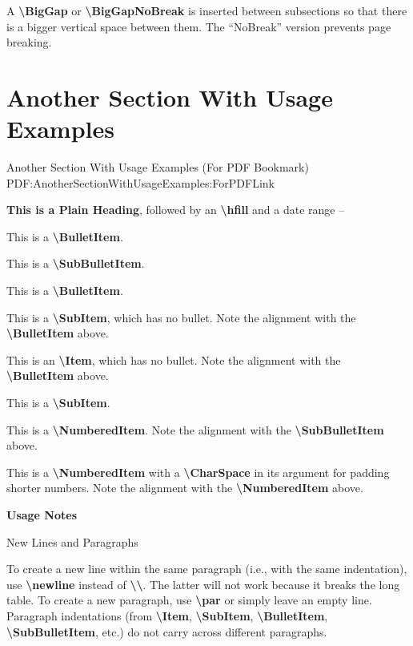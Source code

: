 \documentclass[letterpaper,MMMyyyy,nonstop]{simpleresumecv}
\newcommand{\CodeCommand}[1]{\mbox{\textbf{\textbackslash{#1}}}}
\begin{document}
\begin{body}
\GapNoBreak
\BulletItem
A \CodeCommand{BigGap} or \CodeCommand{BigGapNoBreak} is inserted between subsections so that there is a bigger vertical space between them.
The ``NoBreak'' version prevents page breaking.


\section
{Another\newline
Section\newline
With\newline
Usage\newline
Examples}
{Another Section With Usage Examples (For PDF Bookmark)}
{PDF:AnotherSectionWithUsageExamples:ForPDFLink}

\textbf{This is a Plain Heading},
followed by an \CodeCommand{hfill} and a date range
\hfill
{} --

\GapNoBreak
\BulletItem
This is a \CodeCommand{BulletItem}.
\begin{detail}
\SubBulletItem
This is a \CodeCommand{SubBulletItem}.
\end{detail}

\GapNoBreak
\BulletItem
This is a \CodeCommand{BulletItem}.
\begin{detail}
\SubItem
This is a \CodeCommand{SubItem}, which has no bullet.
Note the alignment with the \CodeCommand{BulletItem} above.
\end{detail}

\GapNoBreak
\Item
This is an \CodeCommand{Item}, which has no bullet.
Note the alignment with the \CodeCommand{BulletItem} above.
\begin{detail}
\SubItem
This is a \CodeCommand{SubItem}.
\end{detail}

\GapNoBreak
\NumberedItem{[16]}
This is a \CodeCommand{NumberedItem}.
Note the alignment with the \CodeCommand{SubBulletItem} above.

\GapNoBreak
\NumberedItem{{\CharSpace}[6]}
This is a \CodeCommand{NumberedItem} with a \CodeCommand{CharSpace} in its argument for padding shorter numbers.
Note the alignment with the \CodeCommand{NumberedItem} above.

\BigGap
\textbf{Usage Notes}

\GapNoBreak
\BulletItem
New Lines and Paragraphs
\begin{detail}
\SubBulletItem
To create a new line within the same paragraph (i.e., with the same indentation), use \CodeCommand{newline} instead of \CodeCommand{\textbackslash}.
The latter will not work because it breaks the long table.
\SubBulletItem
To create a new paragraph, use \CodeCommand{par} or simply leave an empty line.
Paragraph indentations (from
\CodeCommand{Item},
\CodeCommand{SubItem},
\CodeCommand{BulletItem},
\CodeCommand{SubBulletItem},
etc.) do not carry across different paragraphs.
\end{detail}


\end{body}
\end{document}

